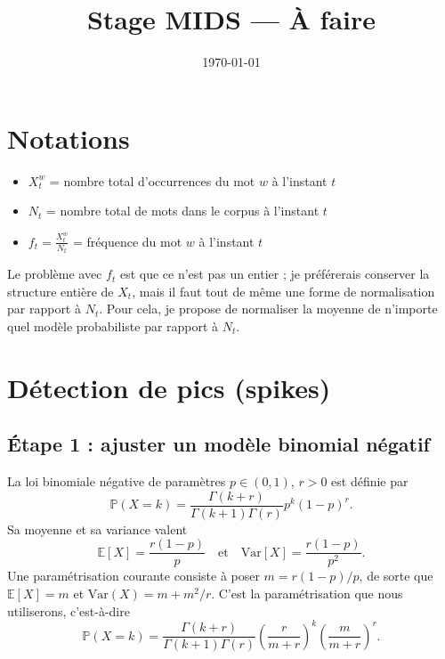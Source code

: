 \documentclass[12pt,a4paper]{article}
\title{Stage MIDS --- À faire}
\author{}
\date{\today}
\begin{document}
\maketitle

\section{Notations}

\begin{itemize}
    \item $X^w_t$ = nombre total d'occurrences du mot $w$ à l'instant $t$
    \item $N_t$ = nombre total de mots dans le corpus à l'instant $t$
    \item $f_t = \frac{X^w_t}{N_t}$ = fréquence du mot $w$ à l'instant $t$
\end{itemize}

Le problème avec $f_t$ est que ce n'est pas un entier ; je préférerais conserver la structure entière de $X_t$, mais il faut tout de même une forme de normalisation par rapport à $N_t$. Pour cela, je propose de normaliser la moyenne de n'importe quel modèle probabiliste par rapport à $N_t$.

\section{Détection de pics (spikes)}

\subsection{Étape 1 : ajuster un modèle binomial négatif}

La loi binomiale négative de paramètres $p \in (0,1)$, $r > 0$ est définie par
$$\mathbb{P}(X = k) = \frac{\Gamma(k + r)}{\Gamma(k + 1) \Gamma(r)} p^k (1-p)^r. $$
Sa moyenne et sa variance valent
$$
\mathbb{E}[X] = \frac{r(1-p)}{p} \quad \text{et} \quad \text{Var}[X] = \frac{r(1-p)}{p^2}.
$$
Une paramétrisation courante consiste à poser $m = r(1-p)/p$, de sorte que $\mathbb{E}[X] = m$ et $\mathrm{Var}(X) = m + m^2/r$. C'est la paramétrisation que nous utiliserons, c'est-à-dire
$$\mathbb{P}(X = k) = \frac{\Gamma(k + r)}{\Gamma(k + 1) \Gamma(r)} \left(\frac{r}{m+r}\right)^k \left(\frac{m}{m+r}\right)^r.$$
\end{document}
